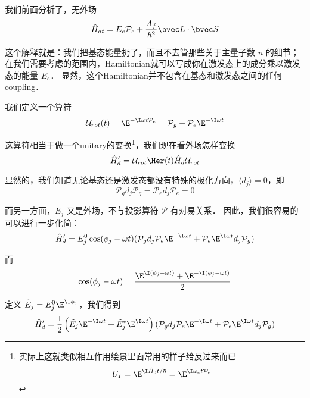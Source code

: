 我们前面分析了，无外场
\begin{equation}
\hat{H}_{at} = E_e\mathcal{P}_e + \frac{A_{f}}{\hbar^2}\bvec L\cdot \bvec S
\end{equation}

这个解释就是：我们把基态能量扔了，而且不去管那些关于主量子数 $n$ 的细节；在我们需要考虑的范围内，Hamiltonian就可以写成你在激发态上的成分乘以激发态的能量 $E_e$． 显然，这个Hamiltonian并不包含在基态和激发态之间的任何coupling．

我们定义一个算符
\begin{equation}
\mathcal{U}_{rot}(t) = \E^{-\I\omega t\mathcal{P}_e} = \mathcal{P}_g + \mathcal{P}_e \E^{-\I\omega t}
\end{equation}

这算符相当于做一个unitary的变换\footnote{实际上这就类似相互作用绘景里面常用的样子给反过来而已
\begin{equation}
U_I = \E^{\I\hat{H}_0t/\hbar} = \E^{\I\omega_e t\mathcal{P}_e}
\end{equation}
}，我们现在看外场怎样变换
\begin{equation}
\hat{H}_d' = \mathcal{U}_{rot}\Her(t)\hat{H}_d \mathcal{U}_{rot}
\end{equation}

显然的，我们知道无论基态还是激发态都没有特殊的极化方向，$\langle d_j \rangle = 0$，即
\begin{equation}
\mathcal{P}_g d_j \mathcal{P}_g = \mathcal{P}_e d_j \mathcal{P}_e = 0
\end{equation}

而另一方面，$E_j$ 又是外场，不与投影算符 $\mathcal{P}$ 有对易关系． 因此，我们很容易的可以进行一步化简：
\begin{equation}
\hat{H}_d' = E_j^0\cos(\phi_j-\omega t) (\mathcal{P}_g d_j \mathcal{P}_e \E^{-\I\omega t} + \mathcal{P}_e \E^{\I\omega t} d_j \mathcal{P}_g)
\end{equation}

而
\begin{equation}
\cos(\phi_j - \omega t) = \frac{\E^{\I(\phi_j-\omega t)} + \E^{-\I(\phi_j-\omega t)}}{2}
\end{equation}

定义 $\tilde{E}_j = E_j^0 \E^{\I\phi_j}$，我们得到
\begin{equation}
\hat{H}_d' = \frac{1}{2}\left(\tilde{E}_j \E^{-\I\omega t} + \tilde{E}_j^* \E^{\I\omega t}\right) (\mathcal{P}_g d_j \mathcal{P}_e \E^{-\I\omega t} + \mathcal{P}_e \E^{\I\omega t} d_j \mathcal{P}_g)
\end{equation}

